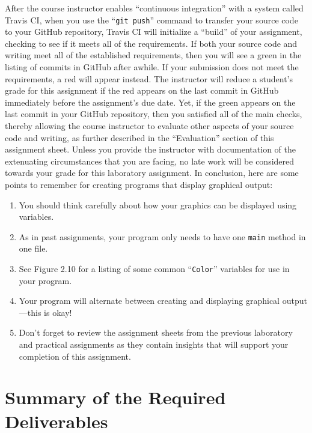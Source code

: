 \documentclass[11pt]{article}
\newcommand{\gitpush}{\command{git push}}
\newcommand{\command}[1]{``\lstinline{#1}''}
\newcommand{\step}[1]{``{#1}''}
\newcommand{\checkmark}{\ding{51}}
\newcommand{\naughtmark}{\ding{55}}
\begin{document}
After the course instructor enables \step{continuous integration} with a system called Travis CI, when you use the
\gitpush{} command to transfer your source code to your GitHub repository, Travis CI will initialize a \step{build} of
your assignment, checking to see if it meets all of the requirements. If both your source code and writing meet all of
the established requirements, then you will see a green \checkmark{} in the listing of commits in GitHub after awhile.
If your submission does not meet the requirements, a red \naughtmark{} will appear instead. The instructor will reduce a
student's grade for this assignment if the red \naughtmark{} appears on the last commit in GitHub immediately before the
assignment's due date. Yet, if the green \checkmark{} appears on the last commit in your GitHub repository, then you
satisfied all of the main checks, thereby allowing the course instructor to evaluate other aspects of your source code
and writing, as further described in the \step{Evaluation} section of this assignment sheet. Unless you provide the
instructor with documentation of the extenuating circumstances that you are facing, no late work will be considered
towards your grade for this laboratory assignment. In conclusion, here are some points to remember for creating programs
that display graphical output:

\begin{enumerate}
  \setlength{\itemsep}{0pt}

\item You should think carefully about how your graphics can be displayed using variables.

\item As in past assignments, your program only needs to have one {\tt main} method in one file.

\item See Figure 2.10 for a listing of some common \command{Color} variables for use in your program.

\item Your program will alternate between creating and displaying graphical output---this is okay!

\item Don't forget to review the assignment sheets from the previous laboratory and practical assignments as they
  contain insights that will support your completion of this assignment.

\end{enumerate}


\section*{Summary of the Required Deliverables}
\end{document}
